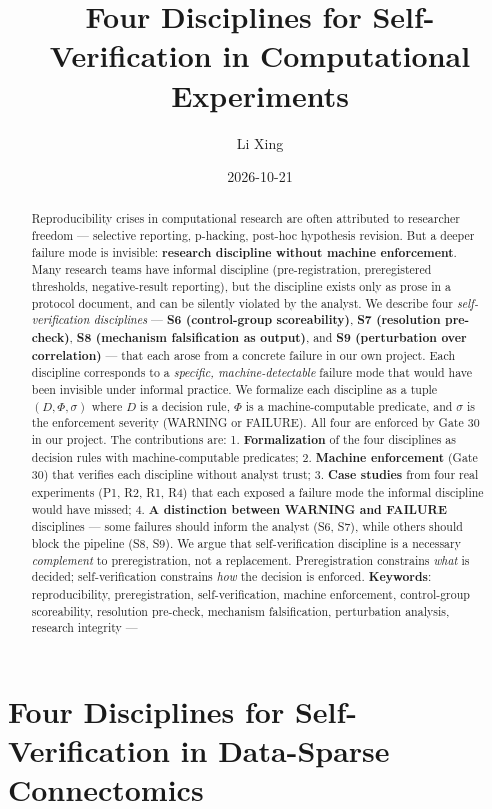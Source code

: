 \documentclass[
]{article}
\title{Four Disciplines for Self-Verification in Computational
Experiments}
\author{Li Xing}
\date{2026-10-21}
\begin{document}
\maketitle
\begin{abstract}
Reproducibility crises in computational research are often attributed to
researcher freedom --- selective reporting, p-hacking, post-hoc
hypothesis revision. But a deeper failure mode is invisible:
\textbf{research discipline without machine enforcement}. Many research
teams have informal discipline (pre-registration, preregistered
thresholds, negative-result reporting), but the discipline exists only
as prose in a protocol document, and can be silently violated by the
analyst. We describe four \emph{self-verification disciplines} ---
\textbf{S6 (control-group scoreability)}, \textbf{S7 (resolution
pre-check)}, \textbf{S8 (mechanism falsification as output)}, and
\textbf{S9 (perturbation over correlation)} --- that each arose from a
concrete failure in our own project. Each discipline corresponds to a
\emph{specific, machine-detectable} failure mode that would have been
invisible under informal practice. We formalize each discipline as a
tuple \((D, \Phi, \sigma)\) where \(D\) is a decision rule, \(\Phi\) is
a machine-computable predicate, and \(\sigma\) is the enforcement
severity (WARNING or FAILURE). All four are enforced by Gate 30 in our
project. The contributions are: 1. \textbf{Formalization} of the four
disciplines as decision rules with machine-computable predicates; 2.
\textbf{Machine enforcement} (Gate 30) that verifies each discipline
without analyst trust; 3. \textbf{Case studies} from four real
experiments (P1, R2, R1, R4) that each exposed a failure mode the
informal discipline would have missed; 4. \textbf{A distinction between
WARNING and FAILURE} disciplines --- some failures should inform the
analyst (S6, S7), while others should block the pipeline (S8, S9). We
argue that self-verification discipline is a necessary \emph{complement}
to preregistration, not a replacement. Preregistration constrains
\emph{what} is decided; self-verification constrains \emph{how} the
decision is enforced. \textbf{Keywords}: reproducibility,
preregistration, self-verification, machine enforcement, control-group
scoreability, resolution pre-check, mechanism falsification,
perturbation analysis, research integrity ---
\end{abstract}

{
\setcounter{tocdepth}{3}
\tableofcontents
}
\section{Four Disciplines for Self-Verification in Data-Sparse
Connectomics}\label{four-disciplines-for-self-verification-in-data-sparse-connectomics}
\end{document}
